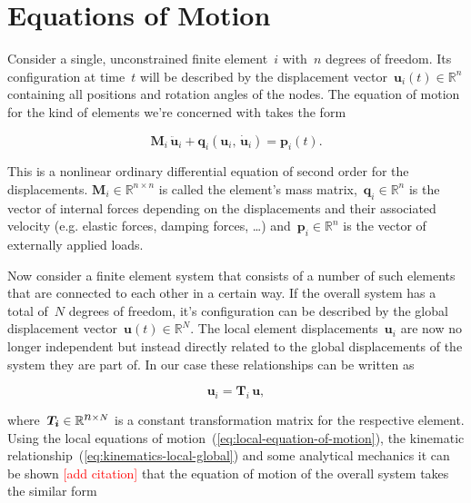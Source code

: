 \chapter{Equations of Motion}

Consider a single, unconstrained finite element~$i$ with~$n$ degrees of freedom.
Its configuration at time~$t$ will be described by the displacement vector~$\boldsymbol{u}_i(t) \in \mathbb{R}^n$ containing all positions and rotation angles of the nodes.
The equation of motion for the kind of elements we're concerned with takes the form

\begin{equation}
\boldsymbol{M}_i\,\ddot{\boldsymbol{u}}_i + \boldsymbol{q}_i(\boldsymbol{u}_i,\,\dot{\boldsymbol{u}}_i) = \boldsymbol{p}_i(t).\label{eq:local-equation-of-motion}
\end{equation}

This is a nonlinear ordinary differential equation of second order for the displacements.
$\boldsymbol{M}_i \in \mathbb{R}^{n \times n}$ is called the element's mass matrix,~$\boldsymbol{q}_i \in \mathbb{R}^n$ is the vector of internal forces depending on the displacements and their associated velocity (e.g. elastic forces, damping forces, \ldots) and~$\boldsymbol{p}_i \in \mathbb{R}^n$ is the vector of externally applied loads.

Now consider a finite element system that consists of a number of such elements that are connected to each other in a certain way.
If the overall system has a total of~$N$ degrees of freedom, it's configuration can be described by the global displacement vector~$\boldsymbol{u}(t) \in \mathbb{R}^{N}$.
The local element displacements~$\boldsymbol{u}_i$ are now no longer independent but instead directly related to the global displacements of the system they are part of.
In our case these relationships can be written as

\begin{equation}
\boldsymbol{u}_i = \boldsymbol{T}_i\,\boldsymbol{u},\label{eq:kinematics-local-global}
\end{equation}

where~$\boldsymbol{T_{i}} \in \mathbb{R}^{\mathlarger{n} \times N}$ is a constant transformation matrix for the respective element.
Using the local equations of motion~(\ref{eq:local-equation-of-motion}), the kinematic relationship~(\ref{eq:kinematics-local-global}) and some analytical mechanics it can be shown \textcolor{red}{[add citation]} that the equation of motion of the overall system takes the similar form

